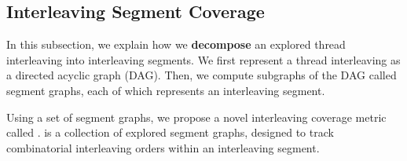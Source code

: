% 



\subsection{Interleaving Segment Coverage}
\label{ss:coverage}

In this subsection, we explain how we \textbf{decompose} an explored
thread interleaving into interleaving segments.
%
We first represent a thread interleaving as a directed acyclic graph
(DAG). Then, we compute subgraphs of the DAG called segment graphs,
each of which represents an interleaving segment.



Using a set of segment graphs, we propose a novel interleaving
coverage metric called \textit{\intcov}.
%
\Intcov is a collection of explored segment graphs, designed to track
combinatorial interleaving orders within an interleaving segment.




